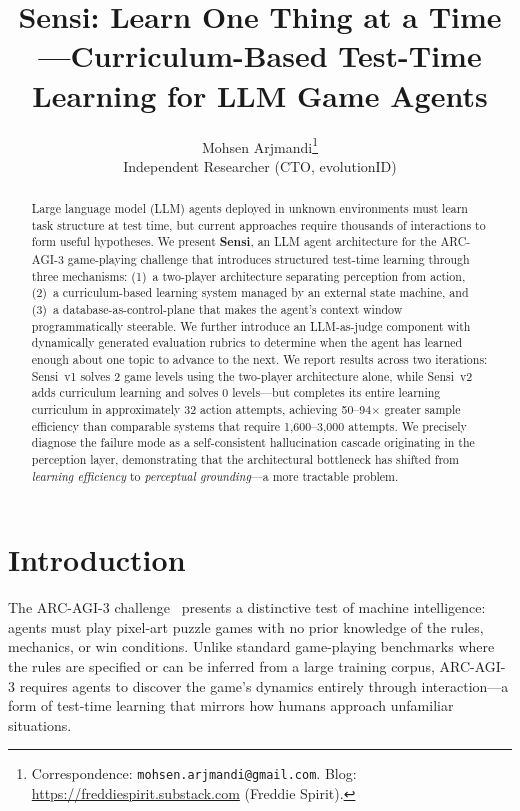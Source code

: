 \documentclass[11pt,letterpaper]{article}
\title{Sensi: Learn One Thing at a Time---Curriculum-Based Test-Time Learning for LLM Game Agents}
\author{
  Mohsen Arjmandi\thanks{Correspondence: \texttt{mohsen.arjmandi@gmail.com}. Blog: \url{https://freddiespirit.substack.com} (Freddie Spirit).}\\
  Independent Researcher (CTO, evolutionID)
}
\date{}
\begin{document}
\maketitle

\begin{abstract}
Large language model (LLM) agents deployed in unknown environments must learn task structure at test time, but current approaches require thousands of interactions to form useful hypotheses. We present \textbf{Sensi}, an LLM agent architecture for the ARC-AGI-3 game-playing challenge that introduces structured test-time learning through three mechanisms: (1)~a two-player architecture separating perception from action, (2)~a curriculum-based learning system managed by an external state machine, and (3)~a database-as-control-plane that makes the agent's context window programmatically steerable. We further introduce an LLM-as-judge component with dynamically generated evaluation rubrics to determine when the agent has learned enough about one topic to advance to the next. We report results across two iterations: Sensi~v1 solves 2 game levels using the two-player architecture alone, while Sensi~v2 adds curriculum learning and solves 0 levels---but completes its entire learning curriculum in approximately 32 action attempts, achieving 50--94$\times$ greater sample efficiency than comparable systems that require 1,600--3,000 attempts. We precisely diagnose the failure mode as a self-consistent hallucination cascade originating in the perception layer, demonstrating that the architectural bottleneck has shifted from \emph{learning efficiency} to \emph{perceptual grounding}---a more tractable problem.
\end{abstract}

\section{Introduction}
\label{sec:intro}

The ARC-AGI-3 challenge~\citep{arcprize2024arcagi} presents a distinctive test of machine intelligence: agents must play pixel-art puzzle games with no prior knowledge of the rules, mechanics, or win conditions. Unlike standard game-playing benchmarks where the rules are specified or can be inferred from a large training corpus, ARC-AGI-3 requires agents to discover the game's dynamics entirely through interaction---a form of test-time learning that mirrors how humans approach unfamiliar situations.
\end{document}
